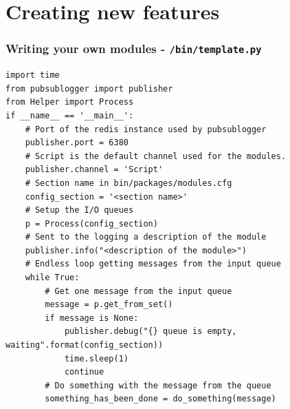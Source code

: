 \section{Creating new features}


\lstset{style=code}
\begin{frame}[fragile]
    \frametitle{Writing your own modules - \texttt{/bin/template.py}}
    \vspace{-0.5cm}
    \begin{lstlisting}
import time
from pubsublogger import publisher
from Helper import Process
if __name__ == '__main__':
    # Port of the redis instance used by pubsublogger
    publisher.port = 6380
    # Script is the default channel used for the modules.
    publisher.channel = 'Script'
    # Section name in bin/packages/modules.cfg
    config_section = '<section name>'
    # Setup the I/O queues
    p = Process(config_section)
    # Sent to the logging a description of the module
    publisher.info("<description of the module>")
    # Endless loop getting messages from the input queue
    while True:
        # Get one message from the input queue
        message = p.get_from_set()
        if message is None:
            publisher.debug("{} queue is empty, waiting".format(config_section))
            time.sleep(1)
            continue
        # Do something with the message from the queue
        something_has_been_done = do_something(message)
    \end{lstlisting}
\end{frame}

